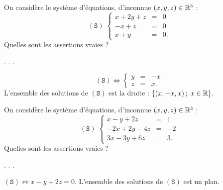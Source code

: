 \begin{question}
On considère le système d'équations, d'inconnue $(x,y,z)\in \mathbb{R}^3$ :  
$$(\mathtt{S}) \; \left\{\begin{array}{rcc}
x+2y+z&=&0\\
-x+z&=&0\\
x+y&=&0.\end{array}\right.$$
Quelles sont les assertions vraies ?
\begin{answers}  
.
.
.
\end{answers}
\begin{explanations} 
$$(\mathtt{S}) \Leftrightarrow  \left\{\begin{array}{rcc}
y&=&-x\\
z&=&x.\end{array}\right.$$
L'ensemble des solutions de $(\mathtt{S})$ est la droite : $\{(x,-x,x)\, ; \; x \in \mathbb{R}\}$.
\end{explanations}
\end{question}


\begin{question}
On considère le système d'équations, d'inconnue $(x,y,z)\in \mathbb{R}^3$ : 
$$(\mathtt{S})  \; \left\{\begin{array}{rcc}
x-y+2z&=&1\\
-2x+2y-4z&=&-2\\
3x-3y+6z&=&3.\end{array}\right.$$
Quelles sont les assertions vraies ?
\begin{answers} 
.
.
.
\end{answers}
\begin{explanations} 
$ (\mathtt{S}) \Leftrightarrow  
x-y+2z=0$.
L'ensemble des solutions de $(\mathtt{S})$ est un plan.
\end{explanations}
\end{question}

